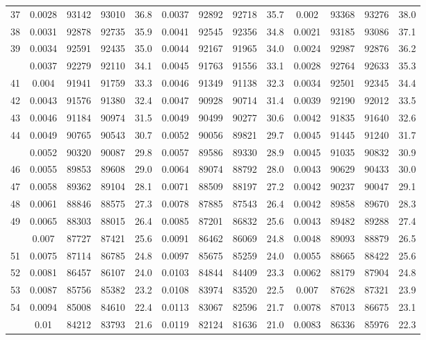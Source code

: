 \documentclass[
  14pt,
]{article}
\begin{document}
\begin{longtable}[t]{lcccccccccccc}
37 & 0.0028 & 93142 & 93010 & 36.8 & 0.0037 & 92892 & 92718 & 35.7 & 0.002 & 93368 & 93276 & 38.0\\
38 & 0.0031 & 92878 & 92735 & 35.9 & 0.0041 & 92545 & 92356 & 34.8 & 0.0021 & 93185 & 93086 & 37.1\\
39 & 0.0034 & 92591 & 92435 & 35.0 & 0.0044 & 92167 & 91965 & 34.0 & 0.0024 & 92987 & 92876 & 36.2\\
\addlinespace
40 & 0.0037 & 92279 & 92110 & 34.1 & 0.0045 & 91763 & 91556 & 33.1 & 0.0028 & 92764 & 92633 & 35.3\\
41 & 0.004 & 91941 & 91759 & 33.3 & 0.0046 & 91349 & 91138 & 32.3 & 0.0034 & 92501 & 92345 & 34.4\\
42 & 0.0043 & 91576 & 91380 & 32.4 & 0.0047 & 90928 & 90714 & 31.4 & 0.0039 & 92190 & 92012 & 33.5\\
43 & 0.0046 & 91184 & 90974 & 31.5 & 0.0049 & 90499 & 90277 & 30.6 & 0.0042 & 91835 & 91640 & 32.6\\
44 & 0.0049 & 90765 & 90543 & 30.7 & 0.0052 & 90056 & 89821 & 29.7 & 0.0045 & 91445 & 91240 & 31.7\\
\addlinespace
45 & 0.0052 & 90320 & 90087 & 29.8 & 0.0057 & 89586 & 89330 & 28.9 & 0.0045 & 91035 & 90832 & 30.9\\
46 & 0.0055 & 89853 & 89608 & 29.0 & 0.0064 & 89074 & 88792 & 28.0 & 0.0043 & 90629 & 90433 & 30.0\\
47 & 0.0058 & 89362 & 89104 & 28.1 & 0.0071 & 88509 & 88197 & 27.2 & 0.0042 & 90237 & 90047 & 29.1\\
48 & 0.0061 & 88846 & 88575 & 27.3 & 0.0078 & 87885 & 87543 & 26.4 & 0.0042 & 89858 & 89670 & 28.3\\
49 & 0.0065 & 88303 & 88015 & 26.4 & 0.0085 & 87201 & 86832 & 25.6 & 0.0043 & 89482 & 89288 & 27.4\\
\addlinespace
50 & 0.007 & 87727 & 87421 & 25.6 & 0.0091 & 86462 & 86069 & 24.8 & 0.0048 & 89093 & 88879 & 26.5\\
51 & 0.0075 & 87114 & 86785 & 24.8 & 0.0097 & 85675 & 85259 & 24.0 & 0.0055 & 88665 & 88422 & 25.6\\
52 & 0.0081 & 86457 & 86107 & 24.0 & 0.0103 & 84844 & 84409 & 23.3 & 0.0062 & 88179 & 87904 & 24.8\\
53 & 0.0087 & 85756 & 85382 & 23.2 & 0.0108 & 83974 & 83520 & 22.5 & 0.007 & 87628 & 87321 & 23.9\\
54 & 0.0094 & 85008 & 84610 & 22.4 & 0.0113 & 83067 & 82596 & 21.7 & 0.0078 & 87013 & 86675 & 23.1\\
\addlinespace
55 & 0.01 & 84212 & 83793 & 21.6 & 0.0119 & 82124 & 81636 & 21.0 & 0.0083 & 86336 & 85976 & 22.3\\

\end{longtable}
\end{document}
